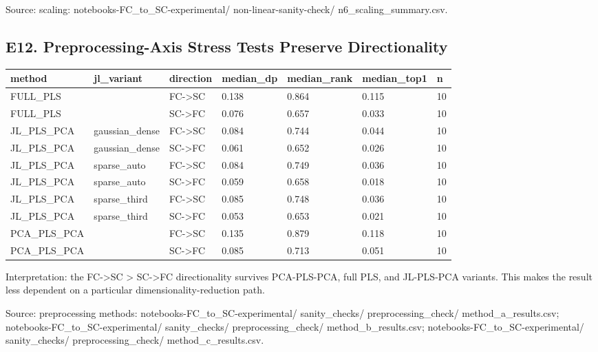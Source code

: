 Source: scaling: notebooks-FC\_to\_SC-experimental/ non-linear-sanity-check/ n6\_scaling\_summary.csv.

\subsection{E12. Preprocessing-Axis Stress Tests Preserve Directionality}\label{e12-preprocessing-axis-stress-tests-preserve-directionality}

{\def\LTcaptype{none} %
\begin{longtable}[]{@{}lllllll@{}}
\toprule\noalign{}
method & jl\_variant & direction & median\_dp & median\_rank & median\_top1 & n \\
\midrule\noalign{}
\endhead
\bottomrule\noalign{}
\endlastfoot
FULL\_PLS & & FC-\textgreater SC & 0.138 & 0.864 & 0.115 & 10 \\
FULL\_PLS & & SC-\textgreater FC & 0.076 & 0.657 & 0.033 & 10 \\
JL\_PLS\_PCA & gaussian\_dense & FC-\textgreater SC & 0.084 & 0.744 & 0.044 & 10 \\
JL\_PLS\_PCA & gaussian\_dense & SC-\textgreater FC & 0.061 & 0.652 & 0.026 & 10 \\
JL\_PLS\_PCA & sparse\_auto & FC-\textgreater SC & 0.084 & 0.749 & 0.036 & 10 \\
JL\_PLS\_PCA & sparse\_auto & SC-\textgreater FC & 0.059 & 0.658 & 0.018 & 10 \\
JL\_PLS\_PCA & sparse\_third & FC-\textgreater SC & 0.085 & 0.748 & 0.036 & 10 \\
JL\_PLS\_PCA & sparse\_third & SC-\textgreater FC & 0.053 & 0.653 & 0.021 & 10 \\
PCA\_PLS\_PCA & & FC-\textgreater SC & 0.135 & 0.879 & 0.118 & 10 \\
PCA\_PLS\_PCA & & SC-\textgreater FC & 0.085 & 0.713 & 0.051 & 10 \\
\end{longtable}
}

Interpretation: the FC-\textgreater SC \textgreater{} SC-\textgreater FC directionality survives PCA-PLS-PCA, full PLS, and JL-PLS-PCA variants. This makes the result less dependent on a particular dimensionality-reduction path.

Source: preprocessing methods: notebooks-FC\_to\_SC-experimental/ sanity\_checks/ preprocessing\_check/ method\_a\_results.csv; notebooks-FC\_to\_SC-experimental/ sanity\_checks/ preprocessing\_check/ method\_b\_results.csv; notebooks-FC\_to\_SC-experimental/ sanity\_checks/ preprocessing\_check/ method\_c\_results.csv.

